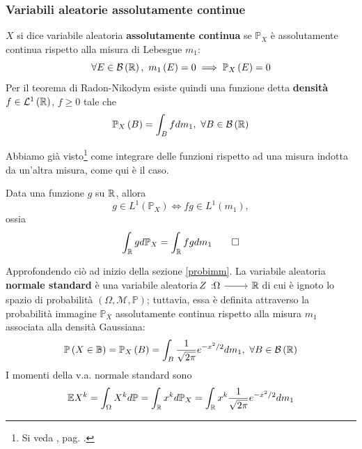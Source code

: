 \subsubsection{Variabili aleatorie assolutamente continue}
\begin{define}
	$X$ si dice variabile aleatoria \textbf{assolutamente continua} se $\mathbb{P}_X$ è assolutamente continua rispetto alla misura di Lebesgue $m_1$: %
	\begin{equation}
		\forall E\in\mathcal{B}\left(\mathbb{R}\right),\ m_1\left(E\right)=0\implies \mathbb{P}_X\left(E\right)=0
	\end{equation}
Per il teorema di Radon-Nikodym esiste quindi una funzione detta \textbf{densità} $f\in\mathcal{L}^1\left(\mathbb{R}\right)$, $f\geq 0$ tale che
\begin{equation}
	\mathbb{P}_X\left(B\right)=\int_B fdm_1,\ \forall B\in\mathcal{B}\left(\mathbb{R}\right)
\end{equation}
\end{define}
Abbiamo già visto\footnote{Si veda , pag. \pageref{misuraindotta}.} come integrare delle funzioni rispetto ad una misura indotta da un'altra misura, come qui è il caso.
\begin{theoremaqed}
	Data una funzione $g$ su $\mathbb{R}$, allora
	\begin{equation}
		g\in L^{1}\left(\mathbb{P}_X\right)\iff fg\in L^{1}\left(m_1\right),
	\end{equation}
	ossia
	\begin{equation}
		\int_{\mathbb{R}}gd\mathbb{P}_X=\int_{\mathbb{R}}fgdm_1\qedhere
	\end{equation}
\end{theoremaqed}
\begin{examplewt}
	 Approfondendo ciò ad inizio della sezione \ref{probimm}. La variabile aleatoria \textbf{normale standard} è una variabile aleatoria $\funz{Z}{\Omega}{\realset}$ di cui è ignoto lo spazio di probabilità $\left(\Omega,\mathcal{M},\mathbb{P}\right)$; tuttavia, essa è definita attraverso la probabilità immagine $\mathbb{P}_X$ assolutamente continua rispetto alla misura $m_1$ associata alla densità Gaussiana:
	 \begin{equation}
	 	\mathbb{P}\left(X\in\mathbb{B}\right)=\mathbb{P}_X\left(B\right)=\int_B\frac{1}{\sqrt{2\pi}}e^{-x^2/2}dm_1,\ \forall B\in\mathcal{B}\left(\realset\right)
	 \end{equation}
 I momenti della v.a. normale standard sono
 \begin{equation*}
 	\mathbb{E}X^k=\int_{\Omega}X^kd\mathbb{P}=\int_{\mathbb{R}}x^kd\mathbb{P}_X=\int_{\mathbb{R}}x^k\frac{1}{\sqrt{2\pi}}e^{-x^2/2}dm_1
 \end{equation*}
\end{examplewt}
